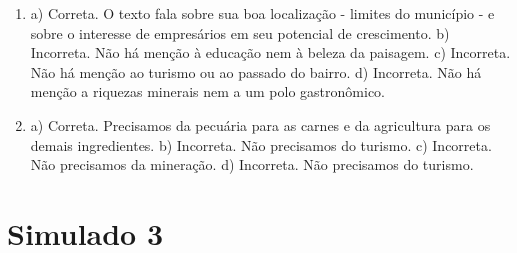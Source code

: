 \begin{enumerate}
\item
a) Correta. O texto fala sobre sua boa localização - limites do
município - e sobre o interesse de empresários em seu potencial de
crescimento.
b) Incorreta. Não há menção à educação nem à beleza da paisagem.
c) Incorreta. Não há menção ao turismo ou ao passado do bairro.
d) Incorreta. Não há menção a riquezas minerais nem a um polo
gastronômico.

\item
a) Correta. Precisamos da pecuária para as carnes e da agricultura para
os demais ingredientes.
b) Incorreta. Não precisamos do turismo.
c) Incorreta. Não precisamos da mineração.
d) Incorreta. Não precisamos do turismo.
\end{enumerate}

\section*{Simulado 3}

